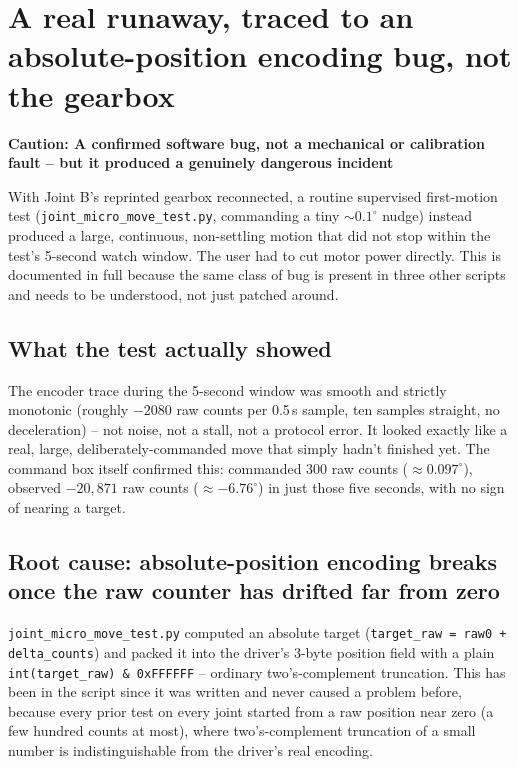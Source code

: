 \documentclass[11pt,letterpaper]{article}
\newenvironment{caution}[1]{%
    \par\addvspace{8pt}%
    \noindent{\color{cautionred}\rule{\linewidth}{0.8pt}}\par\vspace{2pt}
    \noindent\textbf{\color{cautionred}Caution: #1}\par\vspace{2pt}
}{%
    \par\vspace{2pt}\noindent{\color{cautionred}\rule{\linewidth}{0.4pt}}%
    \par\addvspace{8pt}%
}
\begin{document}
\section{A real runaway, traced to an absolute-position encoding bug, not the gearbox}
\label{sec:session-absolute-position-bug}

\begin{caution}{A confirmed software bug, not a mechanical or calibration fault -- but it produced a genuinely dangerous incident}
With Joint B's reprinted gearbox reconnected, a routine supervised first-motion test (\texttt{joint\_micro\_move\_test.py}, commanding a tiny $\sim 0.1^\circ$ nudge) instead produced a large, continuous, non-settling motion that did not stop within the test's 5-second watch window. The user had to cut motor power directly. This is documented in full because the same class of bug is present in three other scripts and needs to be understood, not just patched around.
\end{caution}

\subsection{What the test actually showed}
The encoder trace during the 5-second window was smooth and strictly monotonic (roughly $-2080$ raw counts per 0.5\,s sample, ten samples straight, no deceleration) -- not noise, not a stall, not a protocol error. It looked exactly like a real, large, deliberately-commanded move that simply hadn't finished yet. The command box itself confirmed this: commanded 300 raw counts ($\approx 0.097^\circ$), observed $-20{,}871$ raw counts ($\approx -6.76^\circ$) in just those five seconds, with no sign of nearing a target.

\subsection{Root cause: absolute-position encoding breaks once the raw counter has drifted far from zero}
\texttt{joint\_micro\_move\_test.py} computed an absolute target (\texttt{target\_raw = raw0 + delta\_counts}) and packed it into the driver's 3-byte position field with a plain \texttt{int(target\_raw) \& 0xFFFFFF} -- ordinary two's-complement truncation. This has been in the script since it was written and never caused a problem before, because every prior test on every joint started from a raw position near zero (a few hundred counts at most), where two's-complement truncation of a small number is indistinguishable from the driver's real encoding.
\end{document}
